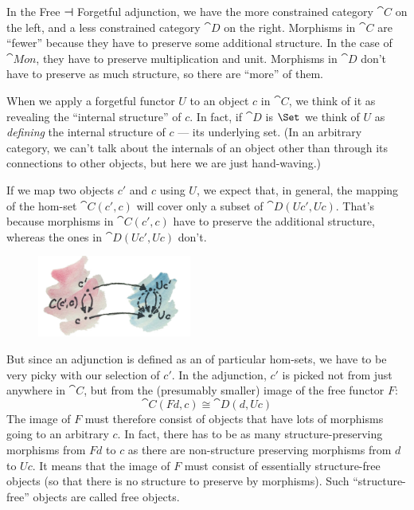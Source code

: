 In the Free ⊣ Forgetful adjunction, we have the more constrained
category $\cat{C}$ on the left, and a less constrained category $\cat{D}$
on the right. Morphisms in $\cat{C}$ are ``fewer'' because they have to
preserve some additional structure. In the case of $\cat{Mon}$, they
have to preserve multiplication and unit. Morphisms in $\cat{D}$ don't
have to preserve as much structure, so there are ``more'' of them.

When we apply a forgetful functor $U$ to an object $c$ in
$\cat{C}$, we think of it as revealing the ``internal structure'' of
$c$. In fact, if $\cat{D}$ is $\Set$ we think of $U$
as \emph{defining} the internal structure of $c$ --- its
underlying set. (In an arbitrary category, we can't talk about the
internals of an object other than through its connections to other
objects, but here we are just hand-waving.)

If we map two objects $c'$ and $c$ using $U$,
we expect that, in general, the mapping of the hom-set
$\cat{C}(c', c)$ will cover only a subset of
$\cat{D}(U c', U c)$. That's because morphisms in
$\cat{C}(c', c)$ have to preserve the additional structure,
whereas the ones in $\cat{D}(U c', U c)$ don't.

\begin{figure}[H]
\centering
\includegraphics[width=0.45\textwidth]{images/forgettingmorphisms.jpg}
\end{figure}

\noindent
But since an adjunction is defined as an  of
particular hom-sets, we have to be very picky with our selection of
$c'$. In the adjunction, $c'$ is picked not
from just anywhere in $\cat{C}$, but from the (presumably smaller) image
of the free functor $F$:
\[\cat{C}(F d, c) \cong \cat{D}(d, U c)\]
The image of $F$ must therefore consist of objects that have lots
of morphisms going to an arbitrary $c$. In fact, there has to be
as many structure-preserving morphisms from $F d$ to $c$
as there are non-structure preserving morphisms from $d$ to
$U c$. It means that the image of $F$ must consist of
essentially structure-free objects (so that there is no structure to
preserve by morphisms). Such ``structure-free'' objects are called free
objects.

